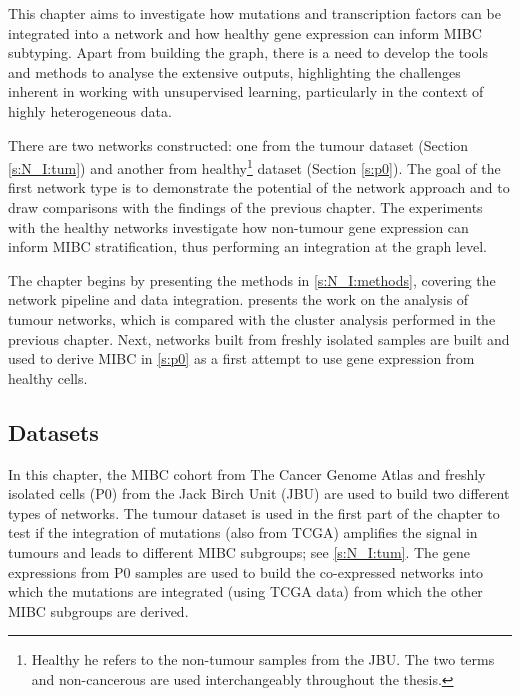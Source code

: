 This chapter aims to investigate how mutations and transcription factors can be integrated into a network and how healthy gene expression can inform MIBC subtyping. Apart from building the graph, there is a need to develop the tools and methods to analyse the extensive outputs, highlighting the challenges inherent in working with unsupervised learning, particularly in the context of highly heterogeneous data.

There are two networks constructed: one from the tumour dataset (Section \ref{s:N_I:tum}) and another from healthy\footnote{Healthy he refers to the non-tumour samples from the JBU. The two terms and non-cancerous are used interchangeably throughout the thesis.} dataset (Section \ref{s:p0}). The goal of the first network type is to demonstrate the potential of the network approach and to draw comparisons with the findings of the previous chapter. The experiments with the healthy networks investigate how non-tumour gene expression can inform MIBC stratification, thus performing an integration at the graph level.

The chapter begins by presenting the methods in \cref{s:N_I:methods}, covering the network pipeline and data integration.  presents the work on the analysis of tumour networks, which is compared with the cluster analysis performed in the previous chapter. Next, networks built from freshly isolated samples are built and used to derive MIBC in \cref{s:p0} as a first attempt to use gene expression from healthy cells.




\subsection*{Datasets}

In this chapter, the MIBC cohort from The Cancer Genome Atlas \citep{TCGA2018-rz} and freshly isolated cells (P0) from the Jack Birch Unit (JBU) are used to build two different types of networks. The tumour dataset is used in the first part of the chapter to test if the integration of mutations (also from TCGA) amplifies the signal in tumours and leads to different MIBC subgroups; see \cref{s:N_I:tum}. The gene expressions from P0 samples are used to build the co-expressed networks into which the mutations are integrated (using TCGA data) from which the other MIBC subgroups are derived.

